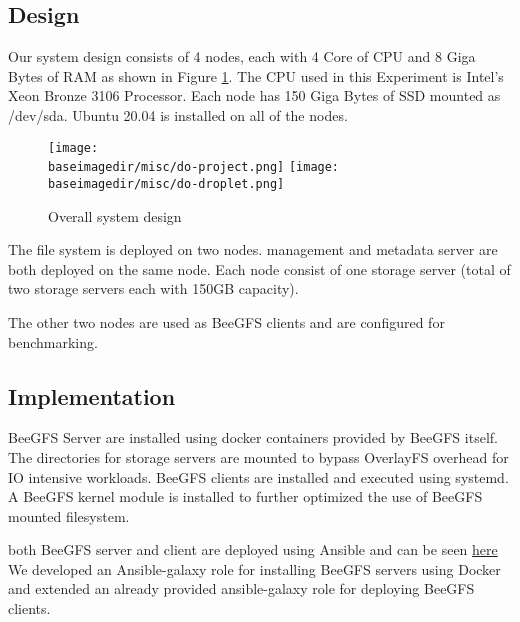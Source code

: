 \documentclass{article}
\newcommand{\baseimagedir}{..}
\begin{document}
\subsection{Design}
Our system design consists of 4 nodes, each with 4 Core of CPU and 8 Giga Bytes of RAM as shown in Figure \ref{fig:overal-system-design}. The CPU used in this Experiment is Intel's Xeon Bronze 3106 Processor. Each node has 150 Giga Bytes of SSD mounted as /dev/sda. Ubuntu 20.04 is installed on all of the nodes. 

\begin{figure}
    \centering
    \texttt{[image: \\baseimagedir/misc/do-project.png]}
    \texttt{[image: \\baseimagedir/misc/do-droplet.png]}
    \caption{Overall system design}
    \label{fig:overal-system-design}
\end{figure}

The file system is deployed on two nodes. management and metadata server are both deployed on the same node. Each node consist of one storage server (total of two storage servers each with 150GB capacity).

The other two nodes are used as BeeGFS clients and are configured for benchmarking.


\subsection{Implementation}
BeeGFS Server are installed using docker containers provided by BeeGFS itself. The directories for storage servers are mounted to bypass OverlayFS overhead for IO intensive workloads.
BeeGFS clients are installed and executed using systemd. A BeeGFS kernel module is installed to further optimized the use of BeeGFS mounted filesystem.

both BeeGFS server and client are deployed using Ansible and can be seen \hyperlink{https://github.com/Parsa2820/BeeGFS-Benchmark/tree/master/ansible}{here}
We developed an Ansible-galaxy role for installing BeeGFS servers using Docker and extended an already provided ansible-galaxy role for deploying BeeGFS clients. 
\end{document}
